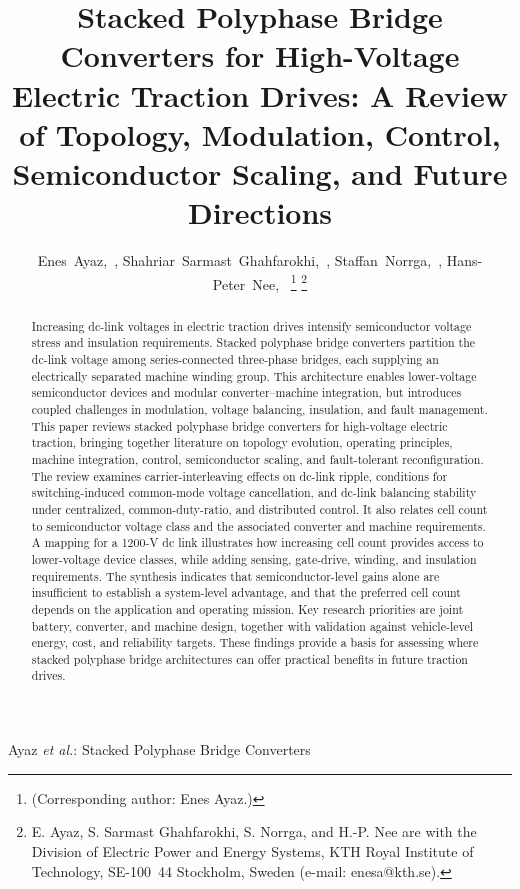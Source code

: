 \documentclass[journal]{IEEEtran}
\begin{document}
\title{Stacked Polyphase Bridge Converters for High-Voltage Electric
Traction Drives: A Review of Topology, Modulation, Control,
Semiconductor Scaling, and Future Directions}

\author{Enes~Ayaz,~,
Shahriar~Sarmast~Ghahfarokhi,~,
Staffan~Norrga,~,
Hans-Peter~Nee,~%
\thanks{(Corresponding author: Enes Ayaz.)}%
\thanks{E. Ayaz, S. Sarmast Ghahfarokhi, S. Norrga, and H.-P. Nee
are with the Division of Electric Power and Energy Systems,
KTH Royal Institute of Technology, SE-100~44 Stockholm, Sweden
(e-mail: enesa@kth.se).}%
}

\markboth{}%
{Ayaz \MakeLowercase{\textit{et al.}}: Stacked Polyphase Bridge Converters}

\maketitle

\begin{abstract}
Increasing dc-link voltages in electric traction drives intensify semiconductor voltage stress and insulation requirements. Stacked polyphase bridge converters partition the dc-link voltage among series-connected three-phase bridges, each supplying an electrically separated machine winding group. This architecture enables lower-voltage semiconductor devices and modular converter--machine integration, but introduces coupled challenges in modulation, voltage balancing, insulation, and fault management. This paper reviews stacked polyphase bridge converters for high-voltage electric traction, bringing together literature on topology evolution, operating principles, machine integration, control, semiconductor scaling, and fault-tolerant reconfiguration. The review examines carrier-interleaving effects on dc-link ripple, conditions for switching-induced common-mode voltage cancellation, and dc-link balancing stability under centralized, common-duty-ratio, and distributed control. It also relates cell count to semiconductor voltage class and the associated converter and machine requirements. A mapping for a 1200-V dc link illustrates how increasing cell count provides access to lower-voltage device classes, while adding sensing, gate-drive, winding, and insulation requirements. The synthesis indicates that semiconductor-level gains alone are insufficient to establish a system-level advantage, and that the preferred cell count depends on the application and operating mission. Key research priorities are joint battery, converter, and machine design, together with validation against vehicle-level energy, cost, and reliability targets. These findings provide a basis for assessing where stacked polyphase bridge architectures can offer practical benefits in future traction drives.
\end{abstract}
\end{document}
